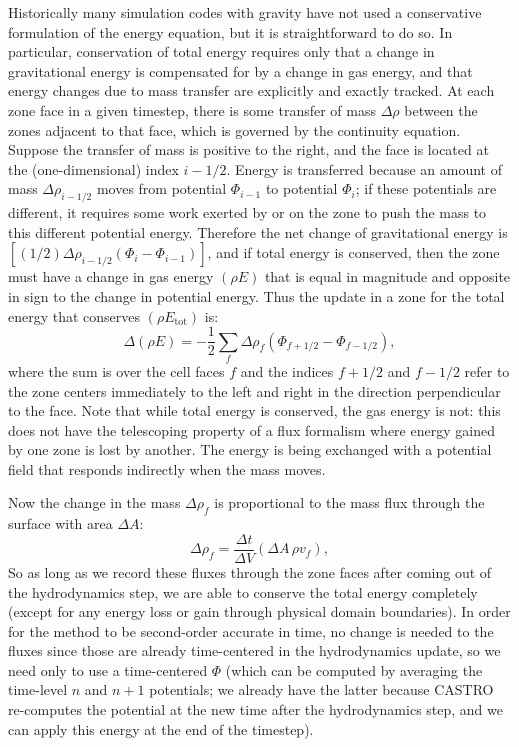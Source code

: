 \documentclass[iop]{../emulateapj}
\begin{document}
Historically many simulation codes with gravity have not used a conservative formulation 
of the energy equation, but it is straightforward to do so. In particular, conservation of 
total energy requires only that a change in gravitational energy is compensated for by a 
change in gas energy, and that energy changes due to mass transfer are explicitly and 
exactly tracked. At each zone face in a given timestep, there is some transfer of mass $\Delta \rho$ between 
the zones adjacent to that face, which is governed by the continuity equation. Suppose the 
transfer of mass is positive to the right, and the face is located at the (one-dimensional)
index $i-1/2$. Energy is transferred because an amount of mass $\Delta \rho_{i-1/2}$ moves from 
potential $\Phi_{i-1}$ to potential $\Phi_{i}$; if these potentials are different, it requires some 
work exerted by or on the zone to push the mass to this different potential energy. Therefore 
the net change of gravitational energy is $\left[(1/2)\Delta \rho_{i-1/2} (\Phi_{i} - \Phi_{i-1})\right]$,
and if total energy is conserved, then the zone must have a change in gas energy 
$(\rho E)$ that is equal in magnitude and opposite in sign to the change in potential energy. 
Thus the update in a zone for the total energy that conserves $(\rho E_{\text{tot}})$ is:
\begin{equation}
  \Delta (\rho E) = -\frac{1}{2}\sum_{f} \Delta \rho_{f} (\Phi_{f+1/2} - \Phi_{f-1/2}),\label{eq:grav_energy_conservation_update}
\end{equation}
where the sum is over the cell faces $f$ and the indices $f+1/2$ and $f-1/2$ refer to 
the zone centers immediately to the left and right in the direction perpendicular to the face.
Note that while total energy is conserved, the gas energy is not: this does not have the 
telescoping property of a flux formalism where energy gained by one zone is lost by another. 
The energy is being exchanged with a potential field that responds indirectly when the mass moves.

Now the change in the mass $\Delta \rho_{f}$ is proportional to the mass flux through the surface with area $\Delta A$:
\begin{equation}
  \Delta \rho_f = \frac{\Delta t}{\Delta V} (\Delta A\, \rho v_{f}),\label{eq:mass_transfer}
\end{equation}
So as long as we record these fluxes through the zone faces after coming out of the hydrodynamics step, 
we are able to conserve the total energy completely (except for any energy loss or gain through 
physical domain boundaries). In order for the method to be second-order accurate in time, 
no change is needed to the fluxes since those are already time-centered 
in the hydrodynamics update, so we need only to use a time-centered $\Phi$ (which can be computed 
by averaging the time-level $n$ and $n+1$ potentials; we already have the latter because CASTRO 
re-computes the potential at the new time after the hydrodynamics step, and we can apply this energy 
at the end of the timestep).
\end{document}
